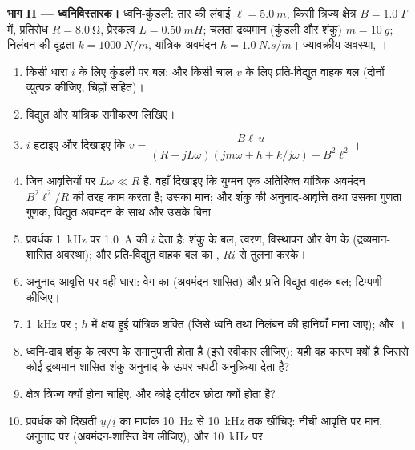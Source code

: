 \begin{problem}
\medskip
\noindent\textbf{भाग II --- ध्वनिविस्तारक।}
ध्वनि-कुंडली: तार की लंबाई $\ell = \qty{5.0}{m}$, किसी त्रिज्य क्षेत्र $B =
\qty{1.0}{T}$ में, प्रतिरोध $R = \qty{8.0}{\ohm}$, प्रेरकत्व $L = \qty{0.50}{mH}$;
चलता द्रव्यमान (कुंडली और शंकु) $m = \qty{10}{g}$; निलंबन की दृढ़ता
$k = \qty{1000}{N/m}$, यांत्रिक अवमंदन $h = \qty{1.0}{N.s/m}$। ज्यावक्रीय
अवस्था, ।
\begin{enumerate}[resume]
  \item किसी धारा $i$ के लिए कुंडली पर बल; और किसी चाल $v$ के लिए
        प्रति-विद्युत वाहक बल (दोनों व्युत्पन्न कीजिए, चिह्नों सहित)।
  \item विद्युत और यांत्रिक समीकरण लिखिए।
  \item $i$ हटाइए और दिखाइए कि
        $\underline v = \dfrac{B\ell\,\underline u}{(R + jL\omega)(jm\omega + h + k/j\omega) + B^2\ell^2}$।
  \item जिन आवृत्तियों पर $L\omega \ll R$ है, वहाँ दिखाइए कि युग्मन एक
        अतिरिक्त यांत्रिक अवमंदन $B^2\ell^2/R$ की तरह काम करता है; उसका
        मान; और शंकु की अनुनाद-आवृत्ति तथा उसका गुणता गुणक, विद्युत अवमंदन
        के साथ और उसके बिना।
  \item प्रवर्धक \qty{1}{kHz} पर \qty{1.0}{A}  की $i$ देता है:
        शंकु के बल, त्वरण, विस्थापन और वेग के  (द्रव्यमान-शासित
        अवस्था); और प्रति-विद्युत वाहक बल का , $Ri$ से तुलना करके।
  \item अनुनाद-आवृत्ति पर वही धारा: वेग का  (अवमंदन-शासित) और
        प्रति-विद्युत वाहक बल; टिप्पणी कीजिए।
  \item \qty{1}{kHz} पर ; $h$ में क्षय हुई यांत्रिक शक्ति
        (जिसे ध्वनि तथा निलंबन की हानियाँ माना जाए); और ।
  \item ध्वनि-दाब शंकु के त्वरण के समानुपाती होता है (इसे स्वीकार लीजिए):
        यही वह कारण क्यों है जिससे कोई द्रव्यमान-शासित शंकु अनुनाद के ऊपर
        चपटी अनुक्रिया देता है?
  \item क्षेत्र त्रिज्य क्यों होना चाहिए, और कोई ट्वीटर छोटा क्यों होता है?
  \item प्रवर्धक को दिखती  $\underline u/\underline i$ का मापांक
        \qty{10}{Hz} से \qty{10}{kHz} तक खींचिए: नीची आवृत्ति पर मान,
        अनुनाद पर (अवमंदन-शासित वेग लीजिए), और \qty{10}{kHz} पर।
\end{enumerate}


\end{problem}
